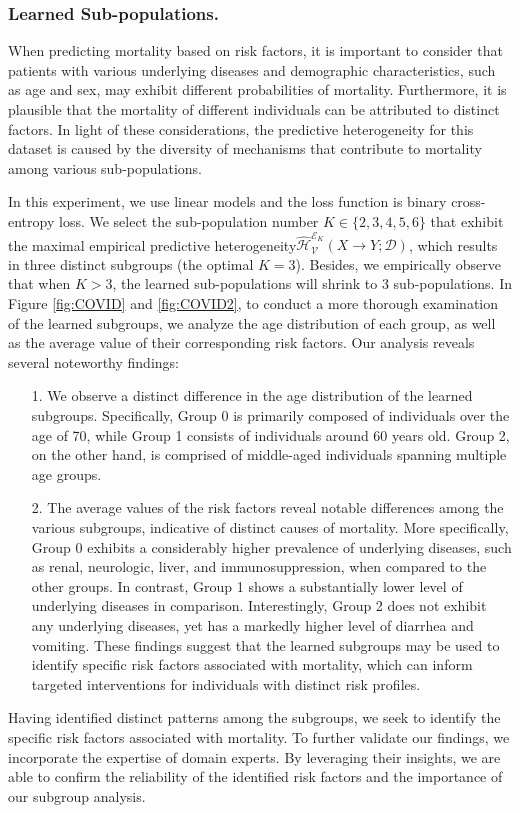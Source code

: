 \subsubsection{Learned Sub-populations.}
When predicting mortality based on risk factors, it is important to consider that patients with various underlying diseases and demographic characteristics, such as age and sex, may exhibit different probabilities of mortality. 
Furthermore, it is plausible that the mortality of different individuals can be attributed to distinct factors. 
In light of these considerations, the predictive heterogeneity for this dataset is caused by the diversity of mechanisms that contribute to mortality among various sub-populations.

In this experiment, we use linear models and the loss function is binary cross-entropy loss. 
We select the sub-population number $K\in \{2,3,4,5,6\}$ that exhibit the maximal empirical predictive heterogeneity$\hat{\mathcal{H}}_{\mathcal V}^{\mathscr E_K}(X\rightarrow Y;\mathcal D)$, which results in three distinct subgroups (the optimal $K=3$).
Besides, we empirically observe that when $K>3$, the learned sub-populations will shrink to 3 sub-populations.
In Figure \ref{fig:COVID} and \ref{fig:COVID2}, to conduct a more thorough examination of the learned subgroups, we analyze the age distribution of each group, as well as the average value of their corresponding risk factors. 
Our analysis reveals several noteworthy findings:
\begin{itemize}
	\item[1.] We observe a distinct difference in the age distribution of the learned subgroups. Specifically, Group 0 is primarily composed of individuals over the age of 70, while Group 1 consists of individuals around 60 years old. 
Group 2, on the other hand, is comprised of middle-aged individuals spanning multiple age groups.
	\item[2.]  The average values of the risk factors reveal notable differences among the various subgroups, indicative of distinct causes of mortality. More specifically, Group 0 exhibits a considerably higher prevalence of underlying diseases, such as renal, neurologic, liver, and immunosuppression, when compared to the other groups. In contrast, Group 1 shows a substantially lower level of underlying diseases in comparison. Interestingly, Group 2 does not exhibit any underlying diseases, yet has a markedly higher level of diarrhea and vomiting. These findings suggest that the learned subgroups may be used to identify specific risk factors associated with mortality, which can inform targeted interventions for individuals with distinct risk profiles.
\end{itemize}
Having identified distinct patterns among the subgroups, we seek to identify the specific risk factors associated with mortality. 
To further validate our findings, we incorporate the expertise of domain experts. 
By leveraging their insights, we are able to confirm the reliability of the identified risk factors and the importance of our subgroup analysis.


